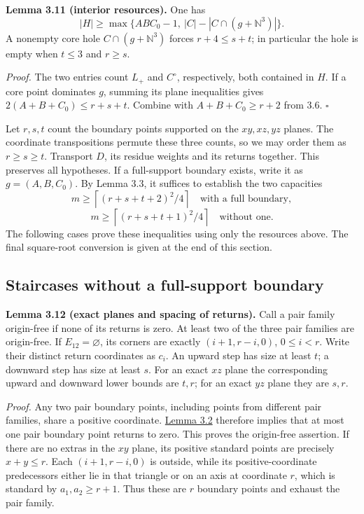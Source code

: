 \documentclass[11pt]{article}
\begin{document}
\label{res:A.10}
\textbf{Lemma 3.11 (interior resources).}
One has
\[
 |H|\ge\max\{ABC_0-1,\ |C|-|C\cap(g+\mathbb N^3)|\}.
\]
A nonempty core hole $C\cap(g+\mathbb N^3)$ forces $r+4\le s+t$;
in particular the hole is empty when $t\le3$ and $r\ge s$.

\emph{Proof.}
The two entries count $L_+$ and $C^\circ$, respectively, both contained
in $H$. If a core point dominates $g$, summing its plane inequalities
gives $2(A+B+C_0)\le r+s+t$. Combine with $A+B+C_0\ge r+2$ from 3.6.
\ensuremath{\square}

Let $r,s,t$ count the boundary points supported on the $xy,xz,yz$
planes. The coordinate transpositions permute these three counts, so
we may order them as $r\ge s\ge t$. Transport $D$, its residue weights
and its returns together. This preserves all hypotheses.
If a full-support boundary exists, write it as $g=(A,B,C_0)$.
By Lemma 3.3, it suffices to establish the two capacities
\[
m\ge\left\lceil(r+s+t+2)^2/4\right\rceil
\quad\text{with a full boundary},\tag{3.7}
\]
\[
m\ge\left\lceil(r+s+t+1)^2/4\right\rceil
\quad\text{without one}.\tag{3.8}
\]
The following cases prove these inequalities using only the resources
above. The final square-root conversion is given at the end of this section.
\subsection{Staircases without a full-support boundary}
\label{res:A.20}
\textbf{Lemma 3.12 (exact planes and spacing of returns).} Call a pair family origin-free if none of its returns is zero. At least two of the three pair families are origin-free. If \(E_{12}=\varnothing\), its corners are exactly \((i+1,r-i,0)\), \(0\le i<r\). Write their distinct return coordinates as \(c_i\). An upward step has size at least \(t\); a downward step has size at least \(s\). For an exact \(xz\) plane the corresponding upward and downward lower bounds are \(t,r\); for an exact \(yz\) plane they are \(s,r\).

\emph{Proof.} Any two pair boundary points, including points from different pair families, share a positive coordinate. \hyperref[res:A.1]{Lemma 3.2} therefore implies that at most one pair boundary point returns to zero. This proves the origin-free assertion. If there are no extras in the \(xy\) plane, its positive standard points are precisely \(x+y\le r\). Each \((i+1,r-i,0)\) is outside, while its positive-coordinate predecessors either lie in that triangle or on an axis at coordinate \(r\), which is standard by \(a_1,a_2\ge r+1\). Thus these are \(r\) boundary points and exhaust the pair family.
\end{document}
